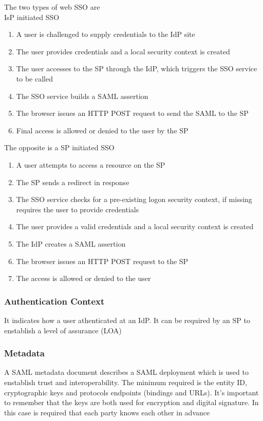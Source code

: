 \documentclass[12pt, a4paper]{article}
\begin{document}
The two types of web SSO are \\ IsP initiated SSO
\begin{enumerate}
    \item A user is challenged to supply credentials to the IdP site
    \item The user provides credentials and a local security context is created
    \item The user accesses to the SP through the IdP, which triggers the SSO service to be called
    \item The SSO service builds a SAML assertion
    \item The browser issues an HTTP POST request to send the SAML to the SP
    \item Final access is allowed or denied to the user by the SP
\end{enumerate}

The opposite is a SP initiated SSO
\begin{enumerate}
    \item A user attempts to access a resource on the SP
    \item The SP sends a redirect in response 
    \item The SSO service checks for a pre-existing logon security context, if missing requires the user to
    provide credentials
    \item The user provides a valid credentials and a local security context is created
    \item The IdP creates a SAML assertion 
    \item The browser issues an HTTP POST request to the SP
    \item The access is allowed or denied to the user
\end{enumerate}

\subsubsection{Authentication Context}
It indicates how a user athenticated at an IdP. It can be required by an SP to enstablish a level of assurance
(LOA)

\subsubsection{Metadata}
A SAML metadata document describes a SAML deployment which is used to enstablish trust and interoperability.
The minimum required is the entity ID, cryptographic keys and protocols endpoints (bindings and URLs). It's 
important to remember that the keys are both used for encryption and digital signature. In this case is 
required that each party knows each other in advance
\end{document}
